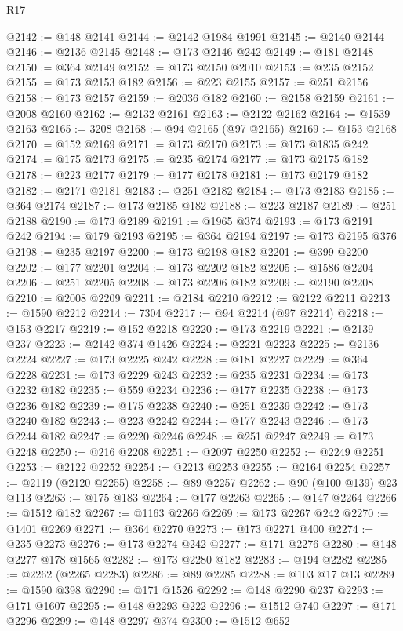\begin{lexlean}{R17}
\begin{coremodule}
@2142 := @148 @2141
@2144 := @2142 @1984 @1991
@2145 := @2140 @2144
@2146 := @2136 @2145
@2148 := @173 @2146 @242
@2149 := @181 @2148
@2150 := @364 @2149
@2152 := @173 @2150 @2010
@2153 := @235 @2152
@2155 := @173 @2153 @182
@2156 := @223 @2155
@2157 := @251 @2156
@2158 := @173 @2157
@2159 := @2036 @182
@2160 := @2158 @2159
@2161 := @2008 @2160
@2162 := @2132 @2161
@2163 := @2122 @2162
@2164 := @1539 @2163
@2165 := 3208
@2168 := @94 @2165 (@97 @2165)
@2169 := @153 @2168
@2170 := @152 @2169
@2171 := @173 @2170
@2173 := @173 @1835 @242
@2174 := @175 @2173
@2175 := @235 @2174
@2177 := @173 @2175 @182
@2178 := @223 @2177
@2179 := @177 @2178
@2181 := @173 @2179 @182
@2182 := @2171 @2181
@2183 := @251 @2182
@2184 := @173 @2183
@2185 := @364 @2174
@2187 := @173 @2185 @182
@2188 := @223 @2187
@2189 := @251 @2188
@2190 := @173 @2189
@2191 := @1965 @374
@2193 := @173 @2191 @242
@2194 := @179 @2193
@2195 := @364 @2194
@2197 := @173 @2195 @376
@2198 := @235 @2197
@2200 := @173 @2198 @182
@2201 := @399 @2200
@2202 := @177 @2201
@2204 := @173 @2202 @182
@2205 := @1586 @2204
@2206 := @251 @2205
@2208 := @173 @2206 @182
@2209 := @2190 @2208
@2210 := @2008 @2209
@2211 := @2184 @2210
@2212 := @2122 @2211
@2213 := @1590 @2212
@2214 := 7304
@2217 := @94 @2214 (@97 @2214)
@2218 := @153 @2217
@2219 := @152 @2218
@2220 := @173 @2219
@2221 := @2139 @237
@2223 := @2142 @374 @1426
@2224 := @2221 @2223
@2225 := @2136 @2224
@2227 := @173 @2225 @242
@2228 := @181 @2227
@2229 := @364 @2228
@2231 := @173 @2229 @243
@2232 := @235 @2231
@2234 := @173 @2232 @182
@2235 := @559 @2234
@2236 := @177 @2235
@2238 := @173 @2236 @182
@2239 := @175 @2238
@2240 := @251 @2239
@2242 := @173 @2240 @182
@2243 := @223 @2242
@2244 := @177 @2243
@2246 := @173 @2244 @182
@2247 := @2220 @2246
@2248 := @251 @2247
@2249 := @173 @2248
@2250 := @216 @2208
@2251 := @2097 @2250
@2252 := @2249 @2251
@2253 := @2122 @2252
@2254 := @2213 @2253
@2255 := @2164 @2254
@2257 := @2119 (@2120 @2255)
@2258 := @89 @2257
@2262 := @90 (@100 @139) @23 @113
@2263 := @175 @183
@2264 := @177 @2263
@2265 := @147 @2264
@2266 := @1512 @182
@2267 := @1163 @2266
@2269 := @173 @2267 @242
@2270 := @1401 @2269
@2271 := @364 @2270
@2273 := @173 @2271 @400
@2274 := @235 @2273
@2276 := @173 @2274 @242
@2277 := @171 @2276
@2280 := @148 @2277 @178 @1565
@2282 := @173 @2280 @182
@2283 := @194 @2282
@2285 := @2262 (@2265 @2283)
@2286 := @89 @2285
@2288 := @103 @17 @13
@2289 := @1590 @398
@2290 := @171 @1526
@2292 := @148 @2290 @237
@2293 := @171 @1607
@2295 := @148 @2293 @222
@2296 := @1512 @740
@2297 := @171 @2296
@2299 := @148 @2297 @374
@2300 := @1512 @652

\end{coremodule}
\end{lexlean}
